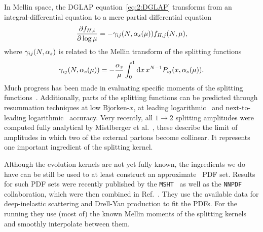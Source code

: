 In Mellin space, the DGLAP equation~\eqref{eq:2:DGLAP} transforms from an integral-differential equation to a mere partial differential equation
\begin{equation}
\frac{\partial f_{H,i}}{\partial \log \mu} = - \gamma_{ij}(N, \alpha_s(\mu)) f_{H, j}(N, \mu),
\end{equation}
where $\gamma_{ij}(N, \alpha_s)$ is related to the Mellin transform of the splitting functions
\begin{equation}
\gamma_{ij}(N, \alpha_s(\mu)) = - \frac{\alpha_s}{\mu} \int_0^1 \mathrm{d} x \, x^{N - 1} P_{ij}(x, \alpha_s (\mu)).
\end{equation}
Much progress has been made in evaluating specific moments of the splitting functions~\cite{Moch:2017uml, Moch:2021qrk, Davies:2016jie, Falcioni:2023tzp, Gehrmann:2023cqm, Falcioni:2023luc, Gehrmann:2023iah}. Additionally, parts of the splitting functions can be predicted through resummation techniques at low Bjorken-$x$, at leading logarithmic~\cite{Jaroszewicz:1982gr} and next-to-leading logarithmic~\cite{Ball:1995vc, Ball:1999sh, Bonvini:2018xvt} accuracy. Very recently, all $1 \rightarrow 2$ splitting amplitudes were computed fully analytical by Mistlberger et al.~\cite{Guan:2024hlf}, these describe the limit of amplitudes in which two of the external partons become collinear. It represents one important ingredient of the splitting kernel.

Although the evolution kernels are not yet fully known, the ingredients we do have can be still be used to at least construct an approximate \NNNLO\ \acs{PDF} set. Results for such \acs{PDF} sets were recently published by the \texttt{MSHT}~\cite{McGowan:2022nag} as well as the \texttt{NNPDF}~\cite{NNPDF:2024nan} collaboration, which were then combined in Ref.~\cite{MSHT:2024tdn}. They use the available data for deep-inelastic scattering and Drell-Yan production to fit the \acs{PDF}s. For the running they use (most of) the known Mellin moments of the splitting kernels and smoothly interpolate between them.

